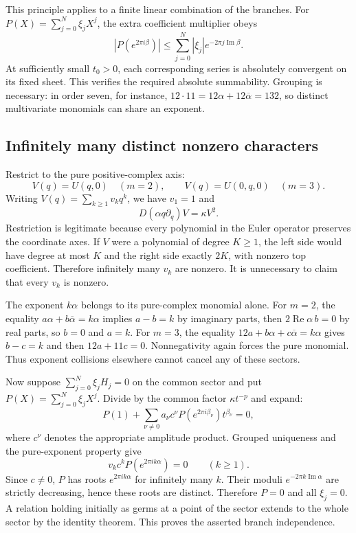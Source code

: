 \documentclass[11pt]{article}
\theoremstyle{remark}\newtheorem{remark}[theorem]{Remark}
\DeclareMathOperator{\Rea}{Re}
\DeclareMathOperator{\Ima}{Im}
\newcommand{\ba}{\overline\alpha}
\numberwithin{equation}{section}
\begin{document}
This principle applies to a finite linear combination of the
branches. For $P(X)=\sum_{j=0}^N\xi_jX^j$, the extra coefficient
multiplier obeys
\[
|P(e^{2\pi i\beta})|\le
\sum_{j=0}^N|\xi_j|e^{-2\pi j\Ima\beta}.
\]
At sufficiently small $t_0>0$, each corresponding series is
absolutely convergent on its fixed sheet. This verifies the
required absolute summability.
Grouping is necessary: in order seven, for instance,
$12\cdot11=12\alpha+12\ba=132$, so distinct multivariate
monomials can share an exponent.

\subsection{Infinitely many distinct nonzero characters}
Restrict to the pure positive-complex axis:
\[
V(q)=U(q,0)\quad(m=2),\qquad
V(q)=U(0,q,0)\quad(m=3).
\]
Writing $V(q)=\sum_{k\ge1}v_kq^k$, we have $v_1=1$ and
\begin{equation}\label{his:o7:pure-axis}
D(\alpha q\partial_q)V=\kappa V^2.
\end{equation}
Restriction is legitimate because every polynomial in the Euler
operator preserves the coordinate axes. If $V$ were a polynomial
of degree $K\ge1$, the left side would have degree at most $K$
and the right side exactly $2K$, with nonzero top coefficient.
Therefore infinitely many $v_k$ are nonzero. It is unnecessary
to claim that every $v_k$ is nonzero.

The exponent $k\alpha$ belongs to its pure-complex monomial alone.
For $m=2$, the equality $a\alpha+b\ba=k\alpha$ implies
$a-b=k$ by imaginary parts, then $2\Rea\alpha\,b=0$ by real
parts, so $b=0$ and $a=k$.
For $m=3$, the equality $12a+b\alpha+c\ba=k\alpha$ gives
$b-c=k$ and then $12a+11c=0$. Nonnegativity again forces the
pure monomial. Thus exponent collisions elsewhere cannot cancel
any of these sectors.

Now suppose $\sum_{j=0}^N\xi_jH_j=0$ on the common sector
and put $P(X)=\sum_{j=0}^N\xi_jX^j$.
Divide by the common factor $\kappa t^{-p}$ and expand:
\[
P(1)+\sum_{\nu\ne0}a_\nu c^\nu
 P(e^{2\pi i\beta_\nu})t^{\beta_\nu}=0,
\]
where $c^\nu$ denotes the appropriate amplitude product.
Grouped uniqueness and the pure-exponent property give
\[
v_kc^kP(e^{2\pi ik\alpha})=0\qquad(k\ge1).
\]
Since $c\ne0$, $P$ has roots $e^{2\pi ik\alpha}$ for infinitely
many $k$. Their moduli $e^{-2\pi k\Ima\alpha}$ are strictly
decreasing, hence these roots are distinct. Therefore $P=0$
and all $\xi_j=0$. A relation holding initially as germs at a
point of the sector extends to the whole sector by the identity
theorem. This proves the asserted branch independence.
\end{document}
